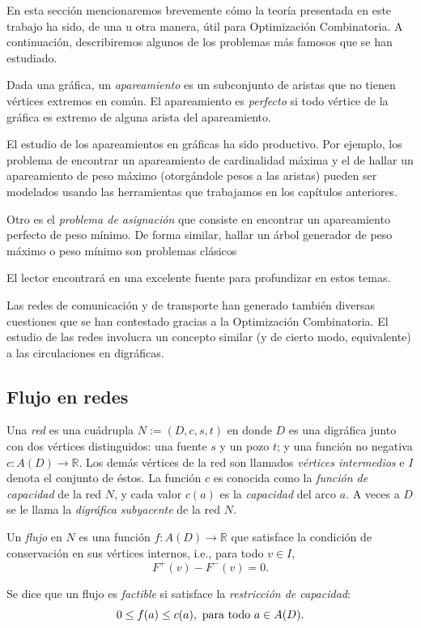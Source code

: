En esta sección mencionaremos brevemente cómo la teoría presentada en este trabajo ha sido, de una u otra manera, útil para Optimización Combinatoria. A continuación, describiremos algunos de los problemas más famosos que se han estudiado.

Dada una gráfica, un \textit{apareamiento} es un subconjunto de aristas que no tienen vértices extremos en común. El apareamiento es \textit{perfecto} si todo vértice de la gráfica es extremo de alguna arista del apareamiento.

El estudio de los apareamientos en gráficas ha sido productivo. Por ejemplo, los problema de encontrar un apareamiento de cardinalidad máxima y el de hallar un apareamiento de peso máximo (otorgándole pesos a las aristas) pueden ser modelados usando las herramientas que trabajamos en los capítulos anteriores. 

Otro es el \textit{problema de asignación} que consiste en encontrar un apareamiento perfecto de peso mínimo. De forma similar, hallar un árbol generador de peso máximo o peso mínimo son problemas clásicos

El lector encontrará en \cite{Korte} una excelente fuente para profundizar en estos temas.

Las redes de comunicación y de transporte han generado también diversas cuestiones que se han contestado gracias a la Optimización Combinatoria. El estudio de las redes involucra un concepto similar (y de cierto modo, equivalente) a las circulaciones en digráficas.

\subsection{Flujo en redes}
Una \textit{red} es una cuádrupla $N:=(D,c,s,t)$ en donde $D$ es una digráfica junto con dos vértices distinguidos: una fuente $s$ y un pozo $t$; y una función no negativa $c\colon A(D) \rightarrow \mathbb{R}$. Los demás vértices de la red son llamados \textit{vértices intermedios} e $I$ denota el conjunto de éstos. La función $c$ es conocida como la \textit{función de capacidad} de la red $N$, y cada valor $c(a)$ es la \textit{capacidad} del arco $a$. A veces a $D$ se le llama la \textit{digráfica subyacente} de la red $N$.

Un \textit{flujo} en $N$ es una función $f\colon A(D) \rightarrow \mathbb{R}$ que satisface la condición de conservación en sus vértices internos, i.e., para todo $v \in I$,$$ F^{+}(v) - F^{-}(v) = 0.$$

Se dice que un flujo es \textit{factible} si satisface la \textit{restricción de capacidad}: $$0 \leq f(a) \leq c(a), \textnormal{ para todo } a \in A(D).$$

